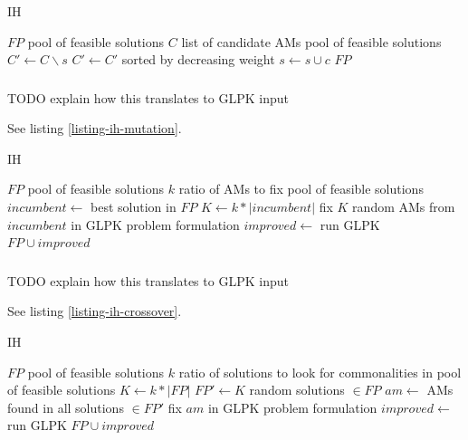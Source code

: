 \begin{algorithm}
\caption{ IH}
\label{listing-ih-hungry}
\begin{algorithmic}
\REQUIRE $FP$ pool of feasible solutions
\REQUIRE $C$ list of candidate AMs
\ENSURE pool of feasible solutions
  \STATE {}
  \STATE $C' \gets C \backslash s$
  \STATE $C' \gets C'$ sorted by decreasing weight
      \STATE $s \gets s \cup c$
    \ENDIF
  \ENDFOR
\ENDFOR
\RETURN $FP$
\end{algorithmic}
\end{algorithm}

\subsubsection{}

TODO explain how this translates to GLPK input

See listing \ref{listing-ih-mutation}.

\begin{algorithm}
\caption{ IH}
\label{listing-ih-mutation}
\begin{algorithmic}
\REQUIRE $FP$ pool of feasible solutions
\REQUIRE $k$ ratio of AMs to fix
\ENSURE pool of feasible solutions
\STATE $incumbent \gets $ best solution in $FP$ 
\STATE $K \gets k * |incumbent|$
\STATE fix $K$ random AMs from $incumbent$ in GLPK problem formulation
\STATE $improved \gets $ run GLPK
\RETURN $FP \cup improved$
\end{algorithmic}
\end{algorithm}

\subsubsection{}

TODO explain how this translates to GLPK input

See listing \ref{listing-ih-crossover}.

\begin{algorithm}
\caption{ IH}
\label{listing-ih-crossover}
\begin{algorithmic}
\REQUIRE $FP$ pool of feasible solutions
\REQUIRE $k$ ratio of solutions to look for commonalities in
\ENSURE pool of feasible solutions
\STATE $K \gets k * |FP|$
\STATE $FP' \gets K$ random solutions $\in FP$
\STATE $am \gets$ AMs found in all solutions $\in FP'$
\STATE fix $am$ in GLPK problem formulation
\STATE $improved \gets $ run GLPK
\RETURN $FP \cup improved$
\end{algorithmic}
\end{algorithm}

